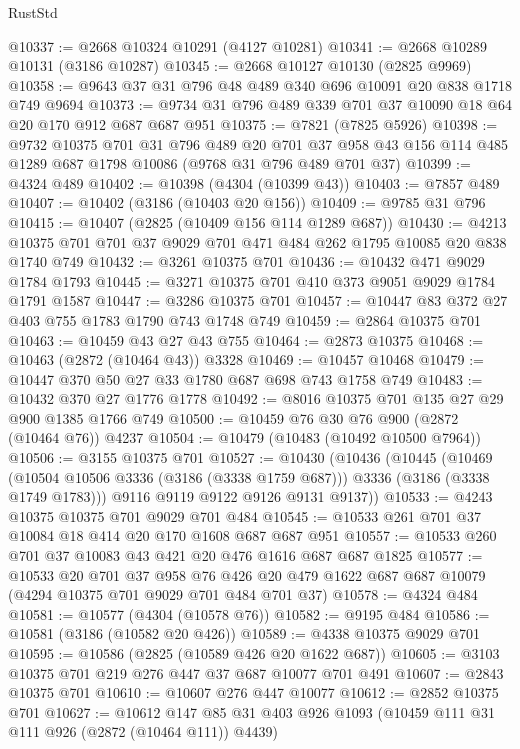 \begin{lexlean}{RustStd}
\begin{coremodule}
@10337 := @2668 @10324 @10291 (@4127 @10281)
@10341 := @2668 @10289 @10131 (@3186 @10287)
@10345 := @2668 @10127 @10130 (@2825 @9969)
@10358 := @9643 @37 @31 @796 @48 @489 @340 @696 @10091 @20 @838 @1718 @749 @9694
@10373 := @9734 @31 @796 @489 @339 @701 @37 @10090 @18 @64 @20 @170 @912 @687 @687 @951
@10375 := @7821 (@7825 @5926)
@10398 := @9732
    @10375
    @701
    @31
    @796
    @489
    @20
    @701
    @37
    @958
    @43
    @156
    @114
    @485
    @1289
    @687
    @1798
    @10086
    (@9768 @31 @796 @489 @701 @37)
@10399 := @4324 @489
@10402 := @10398 (@4304 (@10399 @43))
@10403 := @7857 @489
@10407 := @10402 (@3186 (@10403 @20 @156))
@10409 := @9785 @31 @796
@10415 := @10407 (@2825 (@10409 @156 @114 @1289 @687))
@10430 := @4213 @10375 @701 @701 @37 @9029 @701 @471 @484 @262 @1795 @10085 @20 @838 @1740 @749
@10432 := @3261 @10375 @701
@10436 := @10432 @471 @9029 @1784 @1793
@10445 := @3271 @10375 @701 @410 @373 @9051 @9029 @1784 @1791 @1587
@10447 := @3286 @10375 @701
@10457 := @10447 @83 @372 @27 @403 @755 @1783 @1790 @743 @1748 @749
@10459 := @2864 @10375 @701
@10463 := @10459 @43 @27 @43 @755
@10464 := @2873 @10375
@10468 := @10463 (@2872 (@10464 @43)) @3328
@10469 := @10457 @10468
@10479 := @10447 @370 @50 @27 @33 @1780 @687 @698 @743 @1758 @749
@10483 := @10432 @370 @27 @1776 @1778
@10492 := @8016 @10375 @701 @135 @27 @29 @900 @1385 @1766 @749
@10500 := @10459 @76 @30 @76 @900 (@2872 (@10464 @76)) @4237
@10504 := @10479 (@10483 (@10492 @10500 @7964))
@10506 := @3155 @10375 @701
@10527 := @10430
    (@10436
      (@10445
        (@10469 (@10504 @10506 @3336 (@3186 (@3338 @1759 @687))) @3336 (@3186 (@3338 @1749 @1783)))
        @9116
        @9119
        @9122
        @9126
        @9131
        @9137))
@10533 := @4243 @10375 @10375 @701 @9029 @701 @484
@10545 := @10533 @261 @701 @37 @10084 @18 @414 @20 @170 @1608 @687 @687 @951
@10557 := @10533 @260 @701 @37 @10083 @43 @421 @20 @476 @1616 @687 @687 @1825
@10577 := @10533
    @20
    @701
    @37
    @958
    @76
    @426
    @20
    @479
    @1622
    @687
    @687
    @10079
    (@4294 @10375 @701 @9029 @701 @484 @701 @37)
@10578 := @4324 @484
@10581 := @10577 (@4304 (@10578 @76))
@10582 := @9195 @484
@10586 := @10581 (@3186 (@10582 @20 @426))
@10589 := @4338 @10375 @9029 @701
@10595 := @10586 (@2825 (@10589 @426 @20 @1622 @687))
@10605 := @3103 @10375 @701 @219 @276 @447 @37 @687 @10077 @701 @491
@10607 := @2843 @10375 @701
@10610 := @10607 @276 @447 @10077
@10612 := @2852 @10375 @701
@10627 := @10612
    @147
    @85
    @31
    @403
    @926
    @1093
    (@10459 @111 @31 @111 @926 (@2872 (@10464 @111)) @4439)

\end{coremodule}
\end{lexlean}
